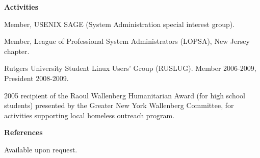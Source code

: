 \documentclass[letterpaper,11pt]{article}
\newcommand{\resheading}[1]{{\large \colorbox{mygrey}{\begin{minipage}{\textwidth}{\textbf{#1 \vphantom{p\^{E}}}}\end{minipage}}}}
\begin{document}
\resheading{Activities}
	\begin{description}
		\item Member, USENIX SAGE (System Administration special
                  interest group).
                \item Member, League of Professional System Administrators
                  (LOPSA), New Jersey chapter.
                \item Rutgers University Student Linux Users' Group
                  (RUSLUG). Member 2006-2009, President 2008-2009.
                \item 2005 recipient of the Raoul Wallenberg Humanitarian
                  Award (for high school students) presented by the Greater
                  New York Wallenberg Committee, for activities supporting
                  local homeless outreach program.
	\end{description}

\resheading{References}
\begin{description}
\item{Available upon request.}
\end{description}
\end{document}
